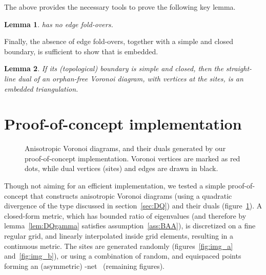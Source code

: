 \documentclass[11pt]{article}
\newtheorem{lemma}{Lemma}
\begin{document}
The above provides the necessary tools to prove the following key lemma. 


\begin{lemma}\label{lem:ef}
 has no edge fold-overs. 
\end{lemma}



Finally, the absence of edge fold-overs, together with a simple and closed boundary, 
is sufficient to show that  is 
embedded.

\begin{lemma}\label{lem:interior}
If its (topological) boundary is simple and closed, 
	then the straight-line dual of an orphan-free Voronoi diagram, 
	with vertices at the sites, 
	is an embedded triangulation. 
\end{lemma}



\section{Proof-of-concept implementation}\label{sec:implementation}

\begin{figure}[ht]
\centering
{}
\quad
{}
\caption{
Anisotropic Voronoi diagrams, and their duals generated by our
proof-of-concept implementation. 
Voronoi vertices are marked as red dots, while dual vertices (sites) and edges are drawn
in black.}
\label{fig:test}
\end{figure}



Though not aiming for an efficient implementation, 
we tested a simple proof-of-concept that constructs anisotropic Voronoi diagrams
(using a quadratic divergence  of the type discussed in section~\ref{sec:DQ}) 
and their duals
(figure~\ref{fig:test}). 
A closed-form metric, which has bounded ratio of eigenvalues 
(and therefore by lemma~\ref{lem:DQgamma} satisfies assumption~\ref{ass:BAA}), 
is discretized on a fine regular grid, and linearly interpolated inside grid elements, resulting in a
continuous metric. The sites are generated randomly (figures~\ref{fig:img_a}
and~\ref{fig:img_b}), or using a combination of random, and equispaced
points forming an (asymmetric) -net~\cite{avd} (remaining figures). 
\end{document}
